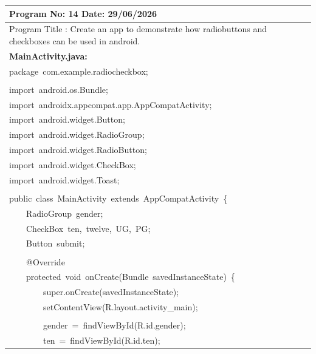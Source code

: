 \documentclass[a4paper,12pt]{article}
\begin{document}
\noindent\begingroup
\renewcommand{\arraystretch}{1.1}
\begin{longtable}{|p{}|}
\hline\endfirsthead\hline\endhead\hline\endfoot\hline\endlastfoot
\rule{0pt}{13pt}Program No: 14 \hfill Date: 29/06/2026 \\
\hline
\rule{0pt}{13pt}Program Title : Create an app to demonstrate how radiobuttons and checkboxes can be used in android. \\
\hline
\rule{0pt}{13pt}\textbf{MainActivity.java:} \\
\hline
{\ttfamily\small package\ com.example.radiocheckbox;} \\
\strut \\
{\ttfamily\small import\ android.os.Bundle;} \\
{\ttfamily\small import\ androidx.appcompat.app.AppCompatActivity;} \\
{\ttfamily\small import\ android.widget.Button;} \\
{\ttfamily\small import\ android.widget.RadioGroup;} \\
{\ttfamily\small import\ android.widget.RadioButton;} \\
{\ttfamily\small import\ android.widget.CheckBox;} \\
{\ttfamily\small import\ android.widget.Toast;} \\
\strut \\
{\ttfamily\small public\ class\ MainActivity\ extends\ AppCompatActivity\ \{} \\
{\ttfamily\small \ \ \ \ RadioGroup\ gender;} \\
{\ttfamily\small \ \ \ \ CheckBox\ ten,\ twelve,\ UG,\ PG;} \\
{\ttfamily\small \ \ \ \ Button\ submit;} \\
\strut \\
{\ttfamily\small \ \ \ \ @Override} \\
{\ttfamily\small \ \ \ \ protected\ void\ onCreate(Bundle\ savedInstanceState)\ \{} \\
{\ttfamily\small \ \ \ \ \ \ \ \ super.onCreate(savedInstanceState);} \\
{\ttfamily\small \ \ \ \ \ \ \ \ setContentView(R.layout.activity\_main);} \\
\strut \\
{\ttfamily\small \ \ \ \ \ \ \ \ gender\ =\ findViewById(R.id.gender);} \\
{\ttfamily\small \ \ \ \ \ \ \ \ ten\ =\ findViewById(R.id.ten);} \\

\end{longtable}
\end{document}
